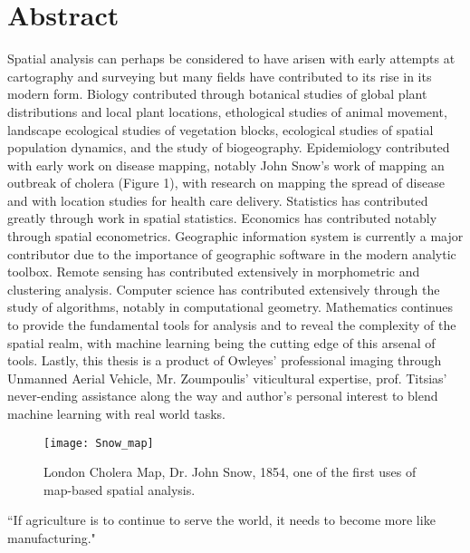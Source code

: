 \documentclass[12pt,a4paper,oneside]{book}
\theoremstyle{plain}
\theoremstyle{definition}
\begin{document}
{\section*{Abstract}
Spatial analysis can perhaps be considered to have arisen with early attempts at cartography and surveying but many fields have contributed to its rise in its modern form. Biology contributed through botanical studies of global plant distributions and local plant locations, ethological studies of animal movement, landscape ecological studies of vegetation blocks, ecological studies of spatial population dynamics, and the study of biogeography. Epidemiology contributed with early work on disease mapping, notably John Snow's work of mapping an outbreak of cholera (Figure 1), with research on mapping the spread of disease and with location studies for health care delivery.  Statistics has contributed greatly through work in spatial statistics. Economics has contributed notably through spatial econometrics. Geographic information system is currently a major contributor due to the importance of geographic software in the modern analytic toolbox. Remote sensing has contributed extensively in morphometric and clustering analysis. Computer science has contributed extensively through the study of algorithms, notably in computational geometry. Mathematics continues to provide the fundamental tools for analysis and to reveal the complexity of the spatial realm, with machine learning being the cutting edge of this arsenal of tools. Lastly, this thesis is a product of Owleyes'  professional imaging through Unmanned Aerial Vehicle, Mr. Zoumpoulis' viticultural expertise, prof. Titsias' never-ending assistance along the way and author's personal interest to blend machine learning with real world tasks.
\begin{figure}[h]
\begin{center}
\texttt{[image: Snow\_map]}
\caption{London Cholera Map, Dr. John Snow, 1854, one of the first uses of map-based spatial analysis.}
\end{center}
\end{figure}
 
\tableofcontents
\begin{savequote}[45mm] 
``If agriculture is to continue to serve the world, it needs to become
more like manufacturing."
\end{savequote}
}
\end{document}
